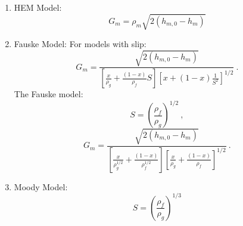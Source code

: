 \documentclass[12pt]{article}
\begin{document}
\begin{enumerate}
    \item HEM Model:
    \begin{equation}
        G_m = \rho_m \sqrt{2 \left( h_{m,0} - h_m \right)}
    \end{equation}
    
    
    
    \clearpage
    \item Fauske Model:
    For models with slip:
    \begin{equation}
        G_m = \frac{\sqrt{2 \left( h_{m,0} - h_m \right)}}{\left[ \frac{x}{\rho_g} + \frac{\left( 1-x \right)}{\rho_f} S \right] \left[ x + \left( 1-x \right)\frac{1}{S^2} \right]^{1/2}}\:.
    \end{equation}
    The Fauske model:
    \begin{equation}
        S = \left( \frac{\rho_f}{\rho_g} \right)^{1/2}\:,
    \end{equation}
    \begin{equation}
        G_m = \frac{\sqrt{2 \left( h_{m,0} - h_m \right)}}{\left[ \frac{x}{\rho_g^{1/2}} + \frac{\left( 1-x \right)}{\rho_f^{1/2}} \right] \left[ \frac{x}{\rho_g} + \frac{\left( 1-x \right)}{\rho_f} \right]^{1/2}}\:.
    \end{equation}
    
    
    
    \clearpage
    \item Moody Model:
    \begin{equation}
        S = \left( \frac{\rho_f}{\rho_g} \right)^{1/3}
    \end{equation}
    



\end{enumerate}
\end{document}
